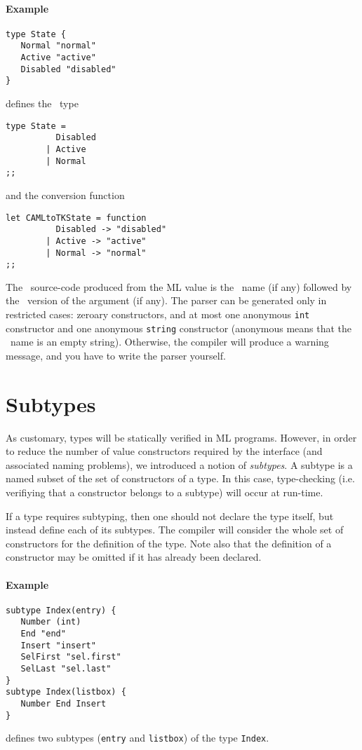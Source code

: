 \paragraph{Example}
\begin{verbatim}
type State { 
   Normal "normal"
   Active "active"
   Disabled "disabled"
}
\end{verbatim} 
defines the \caml\ type
\begin{verbatim}
type State =
          Disabled
        | Active
        | Normal
;;
\end{verbatim} 
and the conversion function
\begin{verbatim}
let CAMLtoTKState = function
          Disabled -> "disabled"
        | Active -> "active"
        | Normal -> "normal"
;;
\end{verbatim} 

The \tk\ source-code produced from the ML value is the \tk\ name (if any)
followed by the \tk\ version of the argument (if any).
The parser can be generated only in restricted cases: zeroary constructors,
and at most one anonymous \verb|int| constructor and one anonymous
\verb|string| constructor (anonymous means that the \tk\ name is an empty
string). Otherwise, the compiler will produce a warning
message, and you have to write the parser yourself. 

\section{Subtypes}
As customary, types will be statically verified in ML programs. However, in
order to reduce the number of value constructors required by the interface
(and associated naming problems),
we introduced a notion of {\em subtypes}. A subtype is a named subset of the
set of constructors of a type. In this case, type-checking (i.e. verifiying
that a constructor belongs to a subtype) will occur at run-time.

If a type requires subtyping, then one should not declare the type itself,
but instead define each of its subtypes. The compiler will consider the
whole set of constructors for the definition of the type. Note also that the
definition of a constructor may be omitted if it has  already been declared.

\paragraph{Example}
\begin{verbatim}
subtype Index(entry) {
   Number (int)
   End "end"
   Insert "insert"
   SelFirst "sel.first"
   SelLast "sel.last" 
}
subtype Index(listbox) {
   Number End Insert 
}
\end{verbatim}
defines two subtypes (\verb|entry| and \verb|listbox|) of the type
\verb|Index|.  

